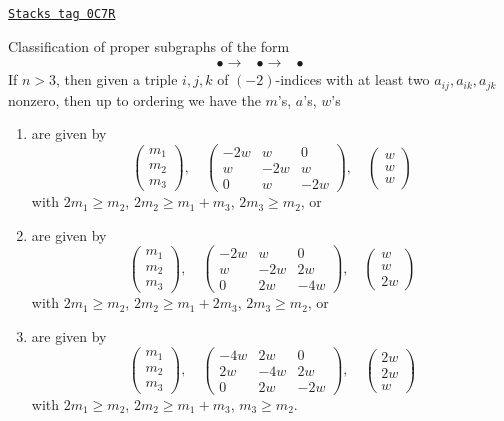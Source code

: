 \begin{lemma}
\label{models-lemma-three-by-three}
\href{https://stacks.math.columbia.edu/tag/0C7R}{\texttt{Stacks tag 0C7R}}

Classification of proper subgraphs of the form
$$
\begin{array}{ccc}\bullet \longrightarrow & \bullet \longrightarrow & \bullet\end{array}
$$
If $n > 3$, then given a triple $i, j, k$ of $(-2)$-indices
with at least two $a_{ij}, a_{ik}, a_{jk}$ nonzero, then up
to ordering we have the $m$'s, $a$'s, $w$'s
\begin{enumerate}
\item
\label{models-item-A3}
are given by
$$
\left(
\begin{matrix}
m_1 \\
m_2 \\
m_3
\end{matrix}
\right),
\quad
\left(
\begin{matrix}
-2w & w & 0 \\
w & -2w & w \\
0 & w & -2w
\end{matrix}
\right),
\quad
\left(
\begin{matrix}
w \\
w \\
w
\end{matrix}
\right)
$$
with $2m_1 \geq m_2$, $2m_2 \geq m_1 + m_3$, $2m_3 \geq m_2$, or
\item
\label{models-item-C3}
are given by
$$
\left(
\begin{matrix}
m_1 \\
m_2 \\
m_3
\end{matrix}
\right),
\quad
\left(
\begin{matrix}
-2w & w & 0 \\
w & -2w & 2w \\
0 & 2w & -4w
\end{matrix}
\right),
\quad
\left(
\begin{matrix}
w \\
w \\
2w
\end{matrix}
\right)
$$
with $2m_1 \geq m_2$, $2m_2 \geq m_1 + 2m_3$, $2m_3 \geq m_2$, or
\item
\label{models-item-B3}
are given by
$$
\left(
\begin{matrix}
m_1 \\
m_2 \\
m_3
\end{matrix}
\right),
\quad
\left(
\begin{matrix}
-4w & 2w & 0 \\
2w & -4w & 2w \\
0 & 2w & -2w
\end{matrix}
\right),
\quad
\left(
\begin{matrix}
2w \\
2w \\
w
\end{matrix}
\right)
$$
with $2m_1 \geq m_2$, $2m_2 \geq m_1 + m_3$, $m_3 \geq m_2$.
\end{enumerate}
\end{lemma}
